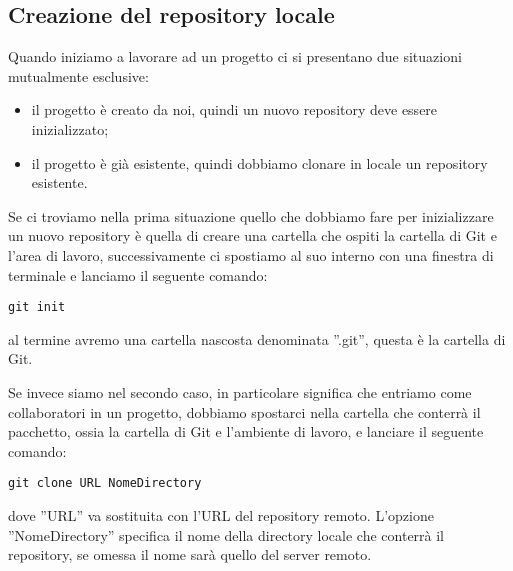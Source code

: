 \subsection{Creazione del repository locale}
Quando iniziamo a lavorare ad un progetto ci si presentano due situazioni mutualmente esclusive:

\begin{itemize}
\item il progetto è creato da noi, quindi un nuovo repository deve essere inizializzato;
\item il progetto è già esistente, quindi dobbiamo clonare in locale un repository esistente.
\end{itemize}

Se ci troviamo nella prima situazione quello che dobbiamo fare per inizializzare un nuovo repository è quella di creare una cartella che ospiti la cartella di Git e l'area di lavoro, successivamente ci spostiamo al suo interno con una finestra di terminale e lanciamo il seguente comando:

\begin{center}
\texttt{git init}
\end{center}

al termine avremo una cartella nascosta denominata ''.git'', questa è la cartella di Git.

Se invece siamo nel secondo caso, in particolare significa che entriamo come collaboratori in un progetto, dobbiamo spostarci nella cartella che conterrà il pacchetto, ossia la cartella di Git e l'ambiente di lavoro, e lanciare il seguente comando:

\begin{center}
\texttt{git clone URL NomeDirectory}
\end{center}

dove ''URL'' va sostituita con l'URL del repository remoto. L'opzione ''NomeDirectory'' specifica il nome della directory locale che conterrà il repository, se omessa il nome sarà quello del server remoto.
